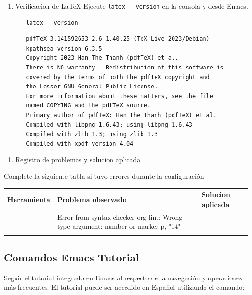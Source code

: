 \documentclass{article}
\begin{document}
\begin{enumerate}
\item Verificacion de \LaTeX{}
Ejecute \texttt{latex -{}-{}version} en la consola y desde Emacs.

\begin{verbatim}
   latex --version
\end{verbatim}

\begin{verbatim}
   pdfTeX 3.141592653-2.6-1.40.25 (TeX Live 2023/Debian)
   kpathsea version 6.3.5
   Copyright 2023 Han The Thanh (pdfTeX) et al.
   There is NO warranty.  Redistribution of this software is
   covered by the terms of both the pdfTeX copyright and
   the Lesser GNU General Public License.
   For more information about these matters, see the file
   named COPYING and the pdfTeX source.
   Primary author of pdfTeX: Han The Thanh (pdfTeX) et al.
   Compiled with libpng 1.6.43; using libpng 1.6.43
   Compiled with zlib 1.3; using zlib 1.3
   Compiled with xpdf version 4.04
\end{verbatim}
\end{enumerate}


\begin{enumerate}
\item Registro de problemas y solucion aplicada
\end{enumerate}

Complete la siguiente tabla si tuvo errores durante la configuración:

\begin{center}
\begin{tabularx}{\textwidth}{lXX}
\textbf{Herramienta} & \textbf{Problema observado} & \textbf{Solucion aplicada}\\[0pt]
\hline
 & Error from syntax checker org-lint: Wrong type argument: number-or-marker-p, "14" & \\[
 &  & \\[0pt]
 &  & \\[0pt]
\end{tabularx}
\end{center}

\subsection{Comandos Emacs Tutorial}
\label{sec:orgd69a92f}
Seguir el tutorial integrado en Emacs al respecto de la navegación y
operaciones más frecuentes. El tutorial puede ser accedido en Español
utilizando el comando:
\end{document}

